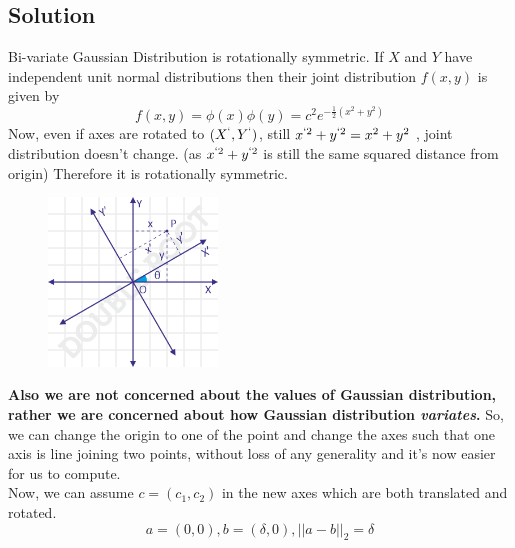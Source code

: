 \documentclass{article}
\begin{document}
\subsection*{Solution}
Bi-variate Gaussian Distribution is rotationally symmetric. If $X$ and $Y$ have independent unit normal distributions then their joint
distribution $f(x, y)$ is given by
$$f(x, y) = \phi(x)\phi(y) = c^2e^{-\frac{1}{2}(x^2+y^2)}$$
Now, even if axes are rotated to $(X^`, Y^`)$, still $x^{`2}+y^{`2} = x^2+y^2$ , joint distribution doesn't change. (as $x^{`2}+y^{`2}$ is still the same squared distance from origin) Therefore it is rotationally symmetric.\par
\begin{figure}[h!]
    \includegraphics[width=0.4\textwidth, center ]{image.png}
\end{figure}
\textbf{Also we are not concerned about the values of Gaussian distribution, rather we are concerned about how Gaussian distribution \textit{variates}.} So, we can change the origin to one of the point and change the axes such that one axis is line joining two points, without loss of any generality and it's now easier for us to compute.\\
Now, we can assume $c=(c_1, c_2)$ in the new axes which are both translated and rotated.
$$a=(0,0), b=(\delta,0), ||a-b||_2 = \delta$$
\end{document}
